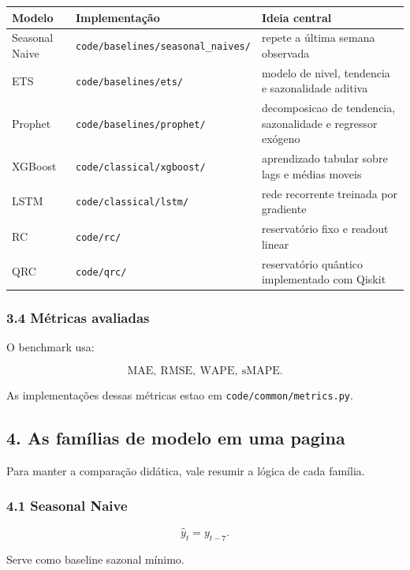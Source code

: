 \documentclass[12pt]{article}
\begin{document}
\begin{longtable}[]{@{}lll@{}}
\toprule\noalign{}
Modelo & Implementação & Ideia central \\
\midrule\noalign{}
\endhead
\bottomrule\noalign{}
\endlastfoot
Seasonal Naive & \texttt{code/baselines/seasonal\_naives/} & repete a última semana observada \\
ETS & \texttt{code/baselines/ets/} & modelo de nivel, tendencia e sazonalidade aditiva \\
Prophet & \texttt{code/baselines/prophet/} & decomposicao de tendencia, sazonalidade e regressor exógeno \\
XGBoost & \texttt{code/classical/xgboost/} & aprendizado tabular sobre lags e médias moveis \\
LSTM & \texttt{code/classical/lstm/} & rede recorrente treinada por gradiente \\
RC & \texttt{code/rc/} & reservatório fixo e readout linear \\
QRC & \texttt{code/qrc/} & reservatório quântico implementado com Qiskit \\
\end{longtable}

\subsubsection{3.4 Métricas avaliadas}\label{34-muxe9tricas-avaliadas}

O benchmark usa:

\[
\mathrm{MAE},\ \mathrm{RMSE},\ \mathrm{WAPE},\ \mathrm{sMAPE}.
\]

As implementações dessas métricas estao em \texttt{code/common/metrics.py}.

\subsection{4. As famílias de modelo em uma pagina}\label{4-as-famuxedlias-de-modelo-em-uma-pagina}

Para manter a comparação didática, vale resumir a lógica de cada família.

\subsubsection{4.1 Seasonal Naive}\label{41-seasonal-naive}

\[
\hat{y}_t = y_{t-7}.
\]

Serve como baseline sazonal mínimo.
\end{document}

